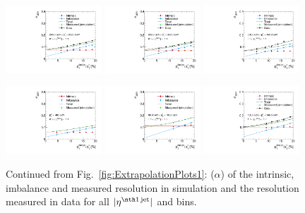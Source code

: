 \begin{figure}[!h]
    \includegraphics[width=0.32\textwidth]{figures/resolution/results/JER_for_2_eta_bin_9_pTGamma_bin_all_contributions_PFCHS_RMS99_mc.pdf}
    \includegraphics[width=0.32\textwidth]{figures/resolution/results/JER_for_2_eta_bin_10_pTGamma_bin_all_contributions_PFCHS_RMS99_mc.pdf}
    \includegraphics[width=0.32\textwidth]{figures/resolution/results/JER_for_2_eta_bin_11_pTGamma_bin_all_contributions_PFCHS_RMS99_mc.pdf}

    \includegraphics[width=0.32\textwidth]{figures/resolution/results/JER_for_2_eta_bin_12_pTGamma_bin_all_contributions_PFCHS_RMS99_mc.pdf}
    \includegraphics[width=0.32\textwidth]{figures/resolution/results/JER_for_3_eta_bin_4_pTGamma_bin_all_contributions_PFCHS_RMS99_mc.pdf}
    \includegraphics[width=0.32\textwidth]{figures/resolution/results/JER_for_3_eta_bin_5_pTGamma_bin_all_contributions_PFCHS_RMS99_mc.pdf}
  \caption{Continued from Fig.~\ref{fig:ExtrapolationPlots1}: \jer($\alpha$) of the intrinsic, imbalance and measured resolution in simulation and the resolution measured in data for all $|\etafirstjet|$ and \ptgamma bins.}
  \label{fig:ExtrapolationPlots2}
\end{figure}

